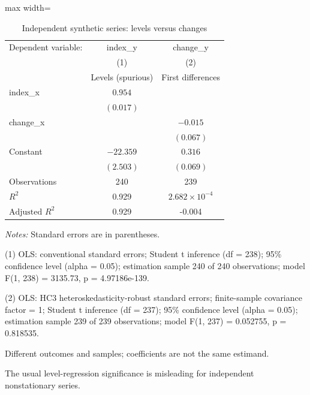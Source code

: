 \begin{table}[htbp]
\centering
\caption{Independent synthetic series: levels versus changes}
\begingroup
\small
\setlength{\tabcolsep}{6pt}
\renewcommand{\arraystretch}{1.12}
\begin{adjustbox}{max width=\linewidth}
\begin{tabular}{@{}lcc@{}}
\toprule
Dependent variable: & index\_y & change\_y \\
 & (1) & (2) \\
 & Levels (spurious) & First differences \\
\midrule
index\_x & $0.954$ &  \\
 & $(0.017)$ &  \\[0.35em]
change\_x &  & $-0.015$ \\
 &  & $(0.067)$ \\[0.35em]
Constant & $-22.359$ & $0.316$ \\
 & $(2.503)$ & $(0.069)$ \\[0.35em]
\midrule
Observations & 240 & 239 \\
$R^{2}$ & 0.929 & $2.682 \times 10^{-4}$ \\
$\text{Adjusted }R^{2}$ & 0.929 & -0.004 \\
\bottomrule
\end{tabular}
\end{adjustbox}
\par\smallskip
\begin{minipage}{\linewidth}
\footnotesize
\raggedright
\textit{Notes:} Standard errors are in parentheses.\par
(1) OLS: conventional standard errors; Student t inference (df = 238); 95\% confidence level (alpha = 0.05); estimation sample 240 of 240 observations; model F(1, 238) = 3135.73, p = 4.97186e-139.\par
(2) OLS: HC3 heteroskedasticity-robust standard errors; finite-sample covariance factor = 1; Student t inference (df = 237); 95\% confidence level (alpha = 0.05); estimation sample 239 of 239 observations; model F(1, 237) = 0.052755, p = 0.818535.\par
Different outcomes and samples; coefficients are not the same estimand.\par
The usual level-regression significance is misleading for independent nonstationary series.\par
\end{minipage}
\endgroup
\end{table}
